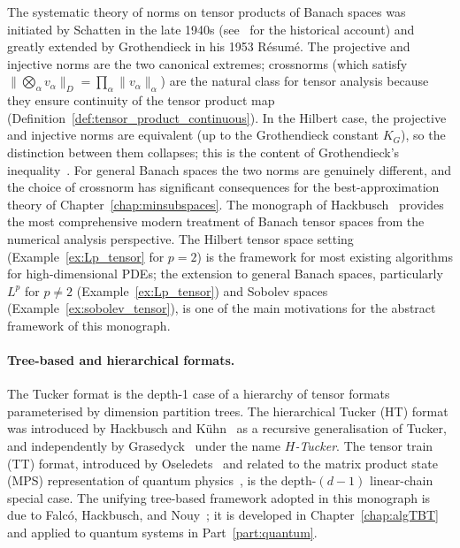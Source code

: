 \begin{remark}
\label{rem:grothendieck_hilbert}
The systematic theory of norms on tensor products of Banach spaces was
initiated by Schatten in the late 1940s (see~\cite{Hackbusch2019} for
the historical account) and greatly extended by Grothendieck in his 1953
Résumé. The projective and injective norms are the two canonical
extremes; crossnorms (which satisfy $\|\bigotimes_\alpha v_\alpha\|_D =
\prod_\alpha \|v_\alpha\|_\alpha$) are the natural class for tensor
analysis because they ensure continuity of the tensor product map
(Definition~\ref{def:tensor_product_continuous}). In the Hilbert case,
the projective and injective norms are equivalent (up to the
Grothendieck constant $K_G$), so the distinction between them collapses;
this is the content of Grothendieck's inequality~\cite{Grothendieck1953}.
For general Banach spaces the two norms are genuinely different, and the
choice of crossnorm has significant consequences for the best-approximation
theory of Chapter~\ref{chap:minsubspaces}.
The monograph of Hackbusch~\cite{Hackbusch2019} provides the most comprehensive modern
treatment of Banach tensor spaces from the numerical analysis perspective.
The Hilbert tensor space setting (Example~\ref{ex:Lp_tensor} for $p=2$)
is the framework for most existing algorithms for high-dimensional PDEs;
the extension to general Banach spaces, particularly $L^p$ for $p \neq 2$
(Example~\ref{ex:Lp_tensor}) and Sobolev spaces
(Example~\ref{ex:sobolev_tensor}), is one of the main motivations for the
abstract framework of this monograph.
\end{remark}

\paragraph{Tree-based and hierarchical formats.}
The Tucker format is the depth-1 case of a hierarchy of tensor formats
parameterised by dimension partition trees. The hierarchical Tucker (HT)
format was introduced by Hackbusch and Kühn~\cite{HaKuehn2009} as a
recursive generalisation of Tucker, and independently by
Grasedyck~\cite{Grasedyck2013} under the name \emph{$H$-Tucker}.
The tensor train (TT) format, introduced by Oseledets~\cite{Oseledets2011}
and related to the matrix product state (MPS) representation of quantum
physics~\cite{Vidal2003}, is the depth-$(d-1)$ linear-chain special case.
The unifying tree-based framework adopted in this monograph is due to
Falcó, Hackbusch, and Nouy~\cite{FHN2021}; it is developed in
Chapter~\ref{chap:algTBT} and applied to quantum systems in
Part~\ref{part:quantum}.

